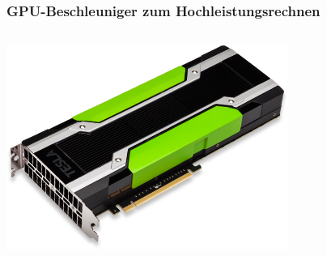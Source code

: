 \begin{frame}
    \frametitle{GPU-Beschleuniger zum Hochleistungsrechnen}
    \begin{columns}\begin{column}{0.5\linewidth}
        \centerline{\includegraphics[height=0.3\textheight]{tesla-3-quater.png}}
    \end{column}\begin{column}{0.5\linewidth}

\end{column}
\end{columns}
\end{frame}

